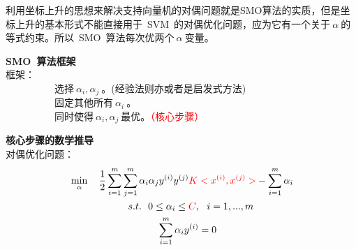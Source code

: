 \indent 利用坐标上升的思想来解决支持向量机的对偶问题就是SMO算法的实质，但是坐标上升的基本形式不能直接用于~SVM~的对偶优化问题，应为它有一个关于$~\alpha~$的等式约束。所以~SMO~算法每次优两个$~\alpha~$变量。

\textbf{SMO~算法框架}~~\\
\indent 框架：\\
\indent ~~~~~~~~~~选择$~\alpha_i,\alpha_j~$。(经验法则亦或者是启发式方法)\\
\indent ~~~~~~~~~~固定其他所有$~\alpha_i~$。\\
\indent ~~~~~~~~~~同时使得$~\alpha_i,\alpha_j~$最优。\textcolor{red}{（核心步骤）}

\textbf{核心步骤的数学推导}~~\\
\indent 对偶优化问题：
\begin{align}
            &\min \limits_\alpha ~~~\frac{1}{2}\sum_{i=1}^{m}\sum_{j=1}^{m}\alpha_i\alpha_jy^{(i)}y^{(j)}\textcolor{red}{K<x^{(i)},x^{(j)}>}-\sum_{i=1}^{m}\alpha_i \nonumber\nonumber\\
         &~~~~~~~~~~~~~~~~~~s.t.~~0 \leq\alpha_i\leq \textcolor{red}{C},~~i=1,...,m \nonumber \\
               &~~~~~~~~~~~~~~~~~~~~~~~~~~~\sum_{i=1}^{m}\alpha_iy^{(i)}=0 \nonumber
\end{align}

